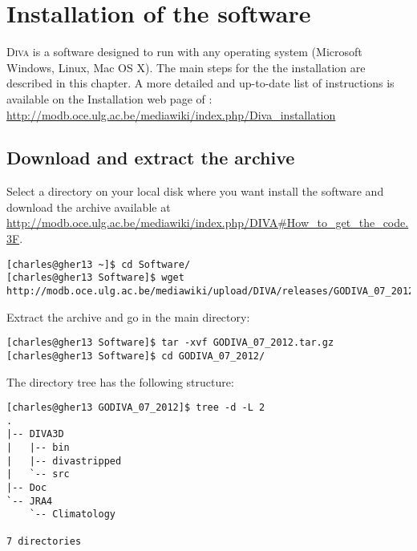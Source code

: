 \chapter{Installation of the software}

\lettrine[lines=2]{D}{iva} is a software designed to run with any operating system (Microsoft Windows, Linux, Mac OS X). The main steps for the the installation are described in this chapter. A more detailed and up-to-date list of instructions is available on the Installation web page of \diva: \url{http://modb.oce.ulg.ac.be/mediawiki/index.php/Diva_installation}


\minitoc


\section{Download and extract the archive}

Select a directory on your local disk where you want install the software and download the archive available at \url{http://modb.oce.ulg.ac.be/mediawiki/index.php/DIVA#How_to_get_the_code.3F}.

\begin{lstlisting}[style=Bash]
[charles@gher13 ~]$ cd Software/
[charles@gher13 Software]$ wget http://modb.oce.ulg.ac.be/mediawiki/upload/DIVA/releases/GODIVA_07_2012.tar.gz
\end{lstlisting}

Extract the archive and go in the main directory:
\begin{lstlisting}[style=Bash]
[charles@gher13 Software]$ tar -xvf GODIVA_07_2012.tar.gz
[charles@gher13 Software]$ cd GODIVA_07_2012/
\end{lstlisting}

The directory tree has the following structure: \newpage 
\begin{lstlisting}[style=Bash]
[charles@gher13 GODIVA_07_2012]$ tree -d -L 2
.
|-- DIVA3D
|   |-- bin
|   |-- divastripped
|   `-- src
|-- Doc
`-- JRA4
    `-- Climatology

7 directories
\end{lstlisting}


